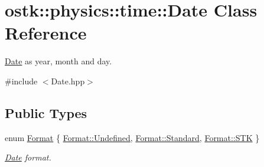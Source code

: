 \hypertarget{classostk_1_1physics_1_1time_1_1_date}{}\section{ostk\+:\+:physics\+:\+:time\+:\+:Date Class Reference}
\label{classostk_1_1physics_1_1time_1_1_date}


\hyperlink{classostk_1_1physics_1_1time_1_1_date}{Date} as year, month and day.  




{\ttfamily \#include $<$Date.\+hpp$>$}

\subsection*{Public Types}
\begin{DoxyCompactItemize}
\item 
enum \hyperlink{classostk_1_1physics_1_1time_1_1_date_a77a2e52ee3bcfd7c93139d2fe2c9a141}{Format} \{ \hyperlink{classostk_1_1physics_1_1time_1_1_date_a77a2e52ee3bcfd7c93139d2fe2c9a141aec0fc0100c4fc1ce4eea230c3dc10360}{Format\+::\+Undefined}, 
\hyperlink{classostk_1_1physics_1_1time_1_1_date_a77a2e52ee3bcfd7c93139d2fe2c9a141aeb6d8ae6f20283755b339c0dc273988b}{Format\+::\+Standard}, 
\hyperlink{classostk_1_1physics_1_1time_1_1_date_a77a2e52ee3bcfd7c93139d2fe2c9a141a9c3581080a26f47bbe0746a2d9b7cf2c}{Format\+::\+S\+TK}
 \}\begin{DoxyCompactList}\small\item\em \hyperlink{classostk_1_1physics_1_1time_1_1_date}{Date} format. \end{DoxyCompactList}
\end{DoxyCompactItemize}
